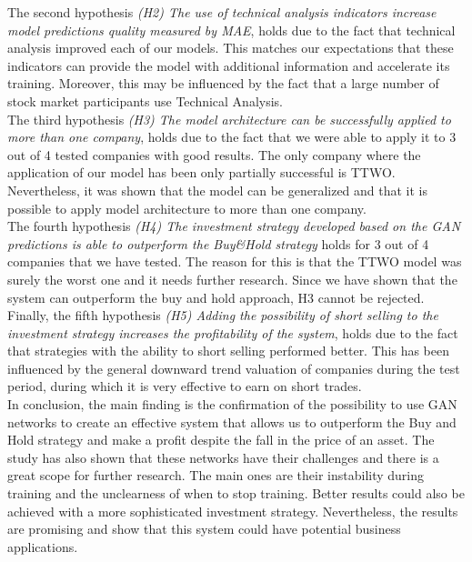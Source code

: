 \documentclass[11pt]{article} %
\begin{document}
The second hypothesis\textit{ (H2) The use of technical analysis indicators increase model predictions quality measured by MAE}, holds due to the fact that technical analysis improved each of our models. This matches our expectations that these indicators can provide the model with additional information and accelerate its training. Moreover, this may be influenced by the fact that a large number of stock market participants use Technical Analysis.\\

The third hypothesis\textit{ (H3) The model architecture can be successfully applied to more than one company}, holds due to the fact that we were able to apply it to 3 out of 4 tested companies with good results. The only company where the application of our model has been only partially successful is TTWO. Nevertheless, it was shown that the model can be generalized and that it is possible to apply model architecture to more than one company.\\

The fourth hypothesis\textit{ (H4) The investment strategy developed based on the GAN predictions is able to outperform the Buy\&Hold strategy} holds for 3 out of 4 companies that we have tested. The reason for this is that the TTWO model was surely the worst one and it needs further research. Since we have shown that the system can outperform the buy and hold approach, H3 cannot be rejected.\\

Finally, the fifth hypothesis\textit{ (H5) Adding the possibility of short selling to the investment strategy increases the profitability of the system}, holds due to the fact that strategies with the ability to short selling performed better.  This has been influenced by the general downward trend valuation of companies during the test period, during which it is very effective to earn on short trades.\\

In conclusion, the main finding is the confirmation of the possibility to use GAN networks to create an effective system that allows us to outperform the Buy and Hold strategy and make a profit despite the fall in the price of an asset. The study has also shown that these networks have their challenges and there is a great scope for further research. The main ones are their instability during training and the unclearness of when to stop training.  Better results could also be achieved with a more sophisticated investment strategy. Nevertheless, the results are promising and show that this system could have potential business applications.
\end{document}
